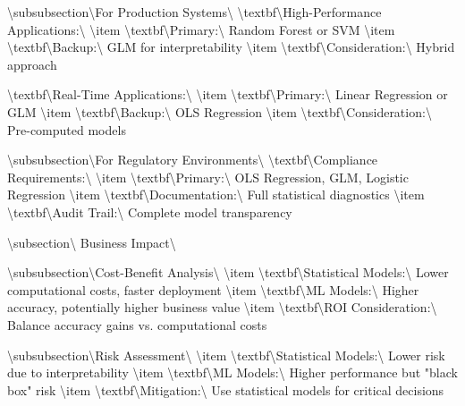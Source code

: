 \documentclass[11pt,a4paper]{article}
\begin{document}
\textbackslash{}subsubsection\textbackslash{}{For Production Systems\textbackslash{}}
\textbackslash{}textbf\textbackslash{}{High-Performance Applications:\textbackslash{}}
\textbackslash{}item \textbackslash{}textbf\textbackslash{}{Primary:\textbackslash{}} Random Forest or SVM
\textbackslash{}item \textbackslash{}textbf\textbackslash{}{Backup:\textbackslash{}} GLM for interpretability
\textbackslash{}item \textbackslash{}textbf\textbackslash{}{Consideration:\textbackslash{}} Hybrid approach

\textbackslash{}textbf\textbackslash{}{Real-Time Applications:\textbackslash{}}
\textbackslash{}item \textbackslash{}textbf\textbackslash{}{Primary:\textbackslash{}} Linear Regression or GLM
\textbackslash{}item \textbackslash{}textbf\textbackslash{}{Backup:\textbackslash{}} OLS Regression
\textbackslash{}item \textbackslash{}textbf\textbackslash{}{Consideration:\textbackslash{}} Pre-computed models

\textbackslash{}subsubsection\textbackslash{}{For Regulatory Environments\textbackslash{}}
\textbackslash{}textbf\textbackslash{}{Compliance Requirements:\textbackslash{}}
\textbackslash{}item \textbackslash{}textbf\textbackslash{}{Primary:\textbackslash{}} OLS Regression, GLM, Logistic Regression
\textbackslash{}item \textbackslash{}textbf\textbackslash{}{Documentation:\textbackslash{}} Full statistical diagnostics
\textbackslash{}item \textbackslash{}textbf\textbackslash{}{Audit Trail:\textbackslash{}} Complete model transparency

\textbackslash{}subsection\textbackslash{}{ Business Impact\textbackslash{}}

\textbackslash{}subsubsection\textbackslash{}{Cost-Benefit Analysis\textbackslash{}}
\textbackslash{}item \textbackslash{}textbf\textbackslash{}{Statistical Models:\textbackslash{}} Lower computational costs, faster deployment
\textbackslash{}item \textbackslash{}textbf\textbackslash{}{ML Models:\textbackslash{}} Higher accuracy, potentially higher business value
\textbackslash{}item \textbackslash{}textbf\textbackslash{}{ROI Consideration:\textbackslash{}} Balance accuracy gains vs. computational costs

\textbackslash{}subsubsection\textbackslash{}{Risk Assessment\textbackslash{}}
\textbackslash{}item \textbackslash{}textbf\textbackslash{}{Statistical Models:\textbackslash{}} Lower risk due to interpretability
\textbackslash{}item \textbackslash{}textbf\textbackslash{}{ML Models:\textbackslash{}} Higher performance but "black box" risk
\textbackslash{}item \textbackslash{}textbf\textbackslash{}{Mitigation:\textbackslash{}} Use statistical models for critical decisions
\end{document}
